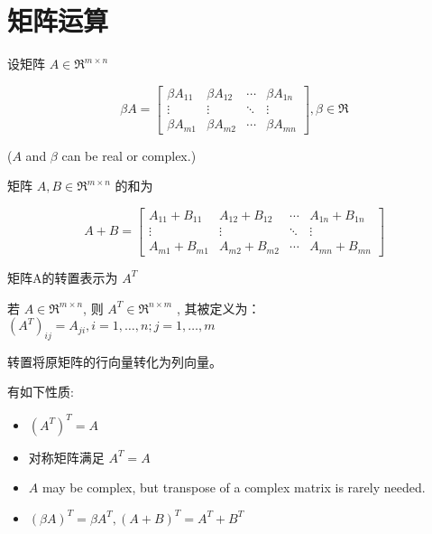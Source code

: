 \section{矩阵运算}

\begin{definition}[矩阵数乘]
    设矩阵 $ A \in \mathfrak{R}^{m \times n} $

    \begin{equation} \beta A=\left[\begin{array}{cccc}\beta A_{11} & \beta A_{12} & \cdots & \beta A_{1 n} \\ \vdots & \vdots & \ddots & \vdots \\ \beta A_{m 1} & \beta A_{m 2} & \cdots & \beta A_{m n}\end{array}\right], \beta \in \mathfrak{R} \end{equation}

    ($ A $ and $ \beta $ can be real or complex.)
\end{definition}

\begin{definition}[矩阵加法]
    矩阵 $ A, B \in \mathfrak{R}^{m \times n} $ 的和为

    \begin{equation} A+B=\left[\begin{array}{cccc}A_{11}+B_{11} & A_{12}+B_{12} & \cdots & A_{1 n}+B_{1 n} \\ \vdots & \vdots & \ddots & \vdots \\ A_{m 1}+B_{m 1} & A_{m 2}+B_{m 2} & \cdots & A_{m n}+B_{m n}\end{array}\right] \end{equation}
\end{definition}

\begin{definition}[Transpose]
    矩阵A的转置表示为 $ A^{T} $
    
    若 $A\in \mathfrak{R}^{m \times n} $, 则 $ A^{T} \in \mathfrak{R}^{n \times m} $ , 其被定义为： $ \left(A^{T}\right)_{i j}=A_{j i}, i=1, \ldots, n ; j=1, \ldots, m $
\end{definition}

转置将原矩阵的行向量转化为列向量。

\begin{corollary}
    [转置的性质]
    有如下性质:
    \begin{itemize}
        \item $ \left(A^{T}\right)^{T}=A $
        \item 对称矩阵满足 $ A^{T}=A $
        \item  $A$ may be complex, but transpose of a complex matrix is rarely needed.
        \item $ (\beta A)^{T}=\beta A^{T},(A+B)^{T}=A^{T}+B^{T} $
    \end{itemize}
\end{corollary}


